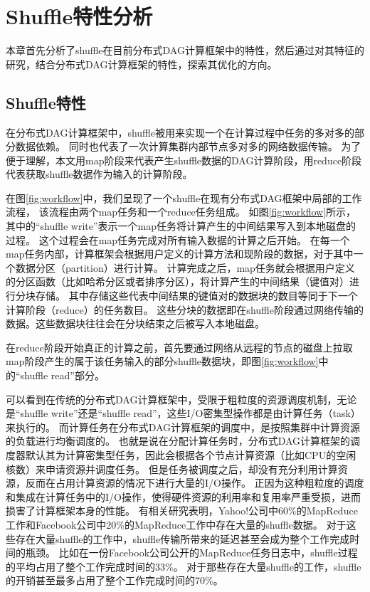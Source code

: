 
\chapter{Shuffle特性分析}
\label{chap:observations}

本章首先分析了shuffle在目前分布式DAG计算框架中的特性，然后通过对其特征的研究，结合分布式DAG计算框架的特性，探索其优化的方向。

\section{Shuffle特性}
在分布式DAG计算框架中，shuffle被用来实现一个在计算过程中任务的多对多的部分数据依赖。
同时也代表了一次计算集群内部节点多对多的网络数据传输。
为了便于理解，本文用map阶段来代表产生shuffle数据的DAG计算阶段，用reduce阶段代表获取shuffle数据作为输入的计算阶段。

在图\ref{fig:workflow}中，我们呈现了一个shuffle在现有分布式DAG框架中局部的工作流程， 该流程由两个map任务和一个reduce任务组成。
如图\ref{fig:workflow}所示，其中的“shuffle write”表示一个map任务将计算产生的中间结果写入到本地磁盘的过程。
这个过程会在map任务完成对所有输入数据的计算之后开始。
在每一个map任务内部，计算框架会根据用户定义的计算方法和现阶段的数据，对于其中一个数据分区（partition）进行计算。
计算完成之后，map任务就会根据用户定义的分区函数（比如哈希分区或者排序分区），将计算产生的中间结果（键值对）进行分块存储。
其中存储这些代表中间结果的键值对的数据块的数目等同于下一个计算阶段（reduce）的任务数目。
这些分块的数据即在shuffle阶段通过网络传输的数据。这些数据块往往会在分块结束之后被写入本地磁盘。

在reduce阶段开始真正的计算之前，首先要通过网络从远程的节点的磁盘上拉取map阶段产生的属于该任务输入的部分shuffle数据块，即图\ref{fig:workflow}中的“shuffle read”部分。

可以看到在传统的分布式DAG计算框架中，受限于粗粒度的资源调度机制，无论是“shuffle write”还是“shuffle read”，这些I/O密集型操作都是由计算任务（task）来执行的。
而计算任务在分布式DAG计算框架的调度中，是按照集群中计算资源的负载进行均衡调度的。
也就是说在分配计算任务时，分布式DAG计算框架的调度器默认其为计算密集型任务，因此会根据各个节点计算资源（比如CPU的空闲核数）来申请资源并调度任务。
但是任务被调度之后，却没有充分利用计算资源，反而在占用计算资源的情况下进行大量的I/O操作。
正因为这种粗粒度的调度和集成在计算任务中的I/O操作，使得硬件资源的利用率和复用率严重受损，进而损害了计算框架本身的性能。
有相关研究表明，Yahoo!公司中60\%的MapReduce工作和Facebook公司中20\%的MapReduce工作中存在大量的shuffle数据\cite{shufflewatcher}。
对于这些存在大量shuffle的工作中，shuffle传输所带来的延迟甚至会成为整个工作完成时间的瓶颈。
比如在一份Facebook公司公开的MapReduce任务日志中，shuffle过程的平均占用了整个工作完成时间的33\%。
对于那些存在大量shuffle的工作，shuffle的开销甚至最多占用了整个工作完成时间的70\%\cite{managing}。

